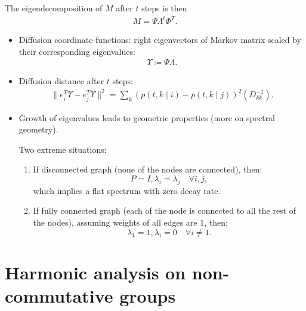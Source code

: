\documentclass{article}
\begin{document}
\begin{enumerate}
    The eigendecomposition of $M$ after $t$ steps is then
    \begin{align}
        M = \Psi \Lambda^t \Phi^T.
    \end{align}
    
    \begin{itemize}
        \item Diffusion coordinate functions: right eigenvectors of Markov matrix scaled by their corresponding eigenvalues: 
        \begin{align}
            \Upsilon \coloneqq \Psi \Lambda.
        \end{align}
        \item Diffusion distance after $t$ steps: 
       \begin{align}
            \| e_i^T  \Upsilon - e_j^T \Upsilon  \|^2 = \sum_{k} (p(t,k\mid i) - p(t,k\mid j))^2 (D_{k k}^{-1}).
       \end{align}
       
       \item Growth of eigenvalues leads to geometric properties (more on spectral geometry).
       
       Two extreme situations:
       \begin{enumerate}
           \item If disconnected graph (none of the nodes are connected), then:
           \[P = I, \lambda_i = \lambda_j \quad \forall i, j, \]
           which implies a flat spectrum with zero decay rate.
           \item If fully connected graph (each of the node is connected to all the rest of the nodes), assuming weights of all edges are $1$, then:
            \[\lambda_1 = 1, \lambda_i = 0 \quad \forall i \neq 1.\]
       \end{enumerate}
    \end{itemize}
\end{enumerate}

\section{Harmonic analysis on non-commutative groups}
\end{document}
